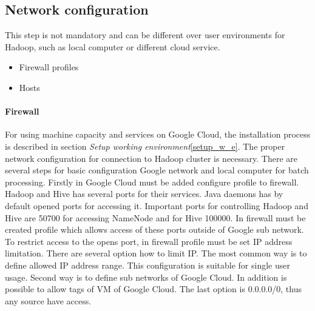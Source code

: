 \documentclass[a4paper,12pt,oneside]{report}
\begin{document}
\subsection{Network configuration}
This step is not mandatory and can be different over user environments for  Hadoop, such as local computer or different cloud service.  
\begin{itemize}
\item Firewall profiles
\item Hosts
\end{itemize}


\paragraph{Firewall} For using machine capacity and services on Google Cloud,  the installation process is described in section \textit{Setup working environment}\ref{setup_w_e}. The proper network configuration for connection to Hadoop cluster is  necessary. There are several steps for basic configuration Google network and local computer for batch processing. Firstly in Google Cloud must be added configure profile to firewall. Hadoop and Hive has several ports for their services. Java daemons has by default opened ports for accessing it. Important ports for controlling Hadoop and Hive are 50700 for accessing NameNode and for Hive 100000. In firewall must be created profile which allows access of these ports outside of Google sub network. To restrict access to the opens port, in firewall profile must be set IP address limitation. There are several option how to limit IP. The most common way is to define allowed IP address range. This configuration is suitable for single user usage. Second way is to define sub networks of Google Cloud. In addition is possible to allow tags of VM of Google Cloud. The last option is  0.0.0.0/0, thus any source have access.
\end{document}
